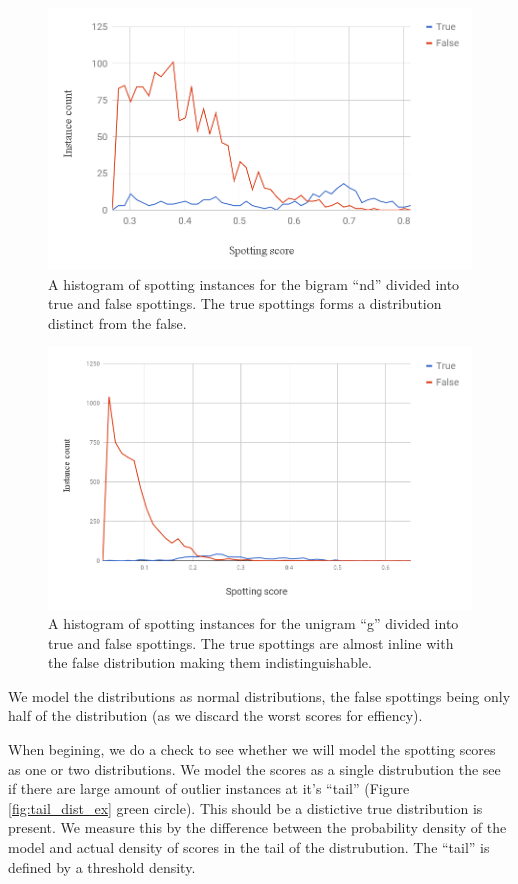 \documentclass[ms,electronic,twosidetoc,letterpaper,chaptercenter,parttop,lol,lof,lot]{byumsphd}
\begin{document}
\begin{figure}
    \centering
    \includegraphics[width=.75\textwidth]{two_dist_ex}
    \caption{A histogram of spotting instances for the bigram ``nd'' divided into true and false spottings. The true spottings forms a distribution distinct from the false.
    }
    \label{fig:two_dist_ex}
\end{figure}
\begin{figure}
    \centering
    \includegraphics[width=.75\textwidth]{one_dist_ex}
    \caption{A histogram of spotting instances for the unigram ``g'' divided into true and false spottings. The true spottings are almost inline with the false distribution making them indistinguishable.
    }
    \label{fig:one_dist_ex}
\end{figure}

We model the distributions as normal distributions, the false spottings being only half of the distribution (as we discard the worst scores for effiency).

When begining, we do a check to see whether we will model the spotting scores as one or two distributions. We model the scores as a single distrubution the see if there are large amount of outlier instances at it's ``tail'' (Figure \ref{fig:tail_dist_ex} green circle). This should be a distictive true distribution is present. We measure this by the difference between the probability density of the model and actual density of scores in the tail of the distrubution. The ``tail'' is defined by a threshold density.
\end{document}
